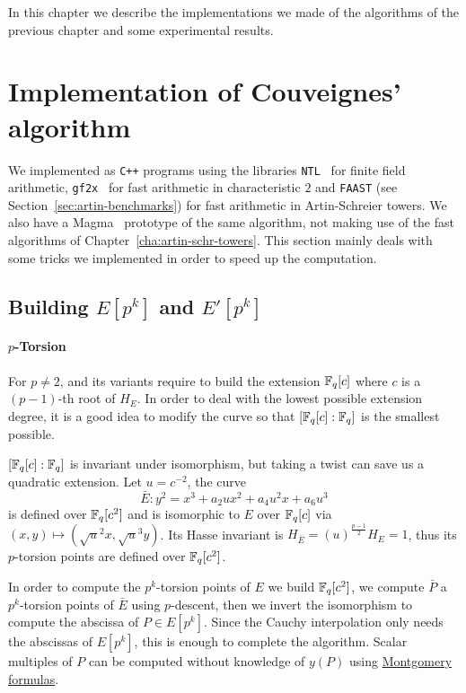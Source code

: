 

In this chapter we describe the implementations we made of the
algorithms of the previous chapter and some experimental results.

\section{Implementation of Couveignes' algorithm}
\label{sec:implementation}

We implemented \ctwoasfimc{} as \texttt{C++} programs using the
libraries \texttt{NTL}~\cite{shoup2003ntl} for finite field
arithmetic, \texttt{gf2x}~\cite{gf2x} for fast arithmetic in
characteristic $2$ and \texttt{FAAST} (see
Section~\ref{sec:artin-benchmarks}) for fast arithmetic in
Artin-Schreier towers.  We also have a Magma~\cite{MAGMA} prototype of
the same algorithm, not making use of the fast algorithms of
Chapter~\ref{cha:artin-schr-towers}.  This section mainly deals with
some tricks we implemented in order to speed up the computation.

\subsection{Building \texorpdfstring{$E[p^k]$}{E[pk]} and \texorpdfstring{$E'[p^k]$}{E[pk]}}
\label{sec:impl:torsion}

\paragraph{$p$-Torsion}
For $p\ne2$, \ctwo{} and its variants require to build the extension
$\mathbb{F}_q[c]$ where $c$ is a $(p-1)$-th root of $H_E$. In order to deal with
the lowest possible extension degree, it is a good idea to modify the
curve so that $[\mathbb{F}_q[c]:\mathbb{F}_q]$ is the smallest possible.

$[\mathbb{F}_q[c]:\mathbb{F}_q]$ is invariant under isomorphism, but taking a twist
can save us a quadratic extension. Let $u=c^{-2}$, the curve
\begin{equation*}
  \bar{E} : y^2 = x^3 + a_2ux^2 + a_4u^2x + a_6u^3
\end{equation*}
is defined over $\mathbb{F}_q[c^2]$ and is isomorphic to $E$ over $\mathbb{F}_q[c]$
via $(x,y)\mapsto(\sqrt{u}^2x,\sqrt{u}^3y)$. Its Hasse invariant is
$H_{\bar{E}} = (u)^{\frac{p-1}{2}}H_E = 1$, thus its $p$-torsion
points are defined over $\mathbb{F}_q[c^2]$.

In order to compute the $p^k$-torsion points of $E$ we build
$\mathbb{F}_q[c^2]$, we compute $\bar{P}$ a $p^k$-torsion points of $\bar{E}$
using $p$-descent, then we invert the isomorphism to compute the
abscissa of $P\in E[p^k]$. Since the Cauchy interpolation only needs
the abscissas of $E[p^k]$, this is enough to complete the
algorithm. Scalar multiples of $P$ can be computed without knowledge
of $y(P)$ using \hyperref[rk:montgomery]{Montgomery formulas}.

